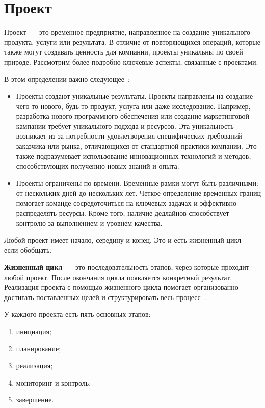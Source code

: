 \chapter{Проект}

Проект~--- это временное предприятие, направленное на создание уникального продукта, услуги или результата. 
В отличие от повторяющихся операций, которые также могут создавать ценность для компании, проекты уникальны по своей природе. 
Рассмотрим более подробно ключевые аспекты, связанные с проектами.

В этом определении важно следующее~\cite{project1}:
\begin{itemize}
	\item Проекты создают уникальные результаты. 
	Проекты направлены на создание чего-то нового, будь то продукт, услуга или даже исследование. Например, разработка нового программного обеспечения или создание маркетинговой кампании требует уникального подхода и ресурсов. 
	Эта уникальность возникает из-за потребности удовлетворения специфических требований заказчика или рынка, отличающихся от стандартной практики компании. 
	Это также подразумевает использование инновационных технологий и методов, способствующих получению новых знаний и опыта.
	\item Проекты ограничены по времени. 
	Временные рамки могут быть различными: от нескольких дней до нескольких лет. 
	Четкое определение временных границ помогает команде сосредоточиться на ключевых задачах и эффективно распределять ресурсы. 
	Кроме того, наличие дедлайнов способствует контролю за выполнением и уровнем качества.
\end{itemize}

Любой проект имеет начало, середину и конец. 
Это и есть жизненный цикл~--- если обобщать. 

\textbf{Жизненный цикл}~--- это последовательность этапов, через которые проходит любой проект. 
После окончания цикла появляется конкретный результат. 
Реализация проекта с помощью жизненного цикла помогает организованно достигать поставленных целей и структурировать весь процесс~\cite{project1}.
	
У каждого проекта есть пять основных этапов: 
\begin{enumerate}
	\item инициация;
	\item планирование;
	\item реализация;
	\item мониторинг и контроль;
	\item завершение.
\end{enumerate}

